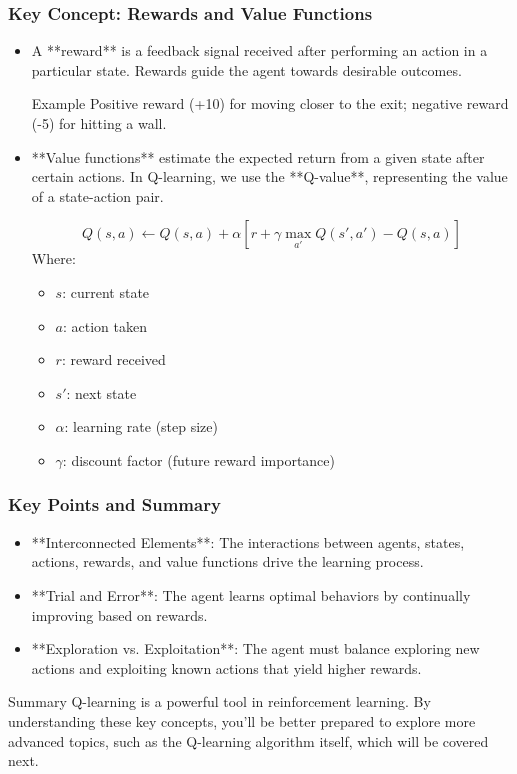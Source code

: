 \documentclass{beamer}
\begin{document}
\begin{frame}[fragile]
    \frametitle{Key Concept: Rewards and Value Functions}
    \begin{itemize}
        \item A **reward** is a feedback signal received after performing an action in a particular state.
        Rewards guide the agent towards desirable outcomes.
        
        \begin{block}{Example}
            Positive reward (+10) for moving closer to the exit; negative reward (-5) for hitting a wall.
        \end{block}
        
        \item **Value functions** estimate the expected return from a given state after certain actions.
        In Q-learning, we use the **Q-value**, representing the value of a state-action pair.
        
        \begin{equation}
        Q(s, a) \leftarrow Q(s, a) + \alpha \left[ r + \gamma \max_{a'} Q(s', a') - Q(s, a) \right]
        \end{equation} 
        Where: 
        \begin{itemize}
            \item $s$: current state
            \item $a$: action taken
            \item $r$: reward received
            \item $s'$: next state
            \item $\alpha$: learning rate (step size)
            \item $\gamma$: discount factor (future reward importance)
        \end{itemize}
    \end{itemize}
\end{frame}

\begin{frame}[fragile]
    \frametitle{Key Points and Summary}
    \begin{itemize}
        \item **Interconnected Elements**: The interactions between agents, states, actions, rewards, and value functions drive the learning process.
        \item **Trial and Error**: The agent learns optimal behaviors by continually improving based on rewards.
        \item **Exploration vs. Exploitation**: The agent must balance exploring new actions and exploiting known actions that yield higher rewards.
    \end{itemize}
    
    \begin{block}{Summary}
        Q-learning is a powerful tool in reinforcement learning. By understanding these key concepts, 
        you'll be better prepared to explore more advanced topics, such as the Q-learning algorithm itself, which will be covered next.
    \end{block}
\end{frame}
\end{document}
